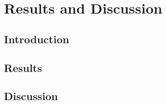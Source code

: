 \label{chapter4}

\chapter{Results and Discussion}
\section{Introduction}

\section{Results}	

\section{Discussion}








